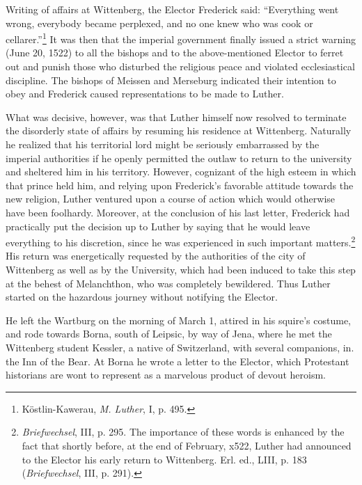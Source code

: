 Writing of affairs at Wittenberg, the Elector Frederick said:
“Everything went wrong, everybody became perplexed, and no one
knew who was cook or cellarer.”\footnote{Köstlin-Kawerau, \textit{M. Luther}, I, p. 495.}
It was then that the imperial government
finally issued a strict warning (June 20, 1522) to all the
bishops and to the above-mentioned Elector to ferret out and punish
those who disturbed the religious peace and violated ecclesiastical discipline.
The bishops of Meissen and Merseburg indicated their intention to obey
and Frederick caused representations to be made to
Luther.

What was decisive, however, was that Luther himself now resolved
to terminate the disorderly state of affairs by resuming his residence
at Wittenberg. Naturally he realized that his territorial lord might
be seriously embarrassed by the imperial authorities if he openly
permitted the outlaw to return to the university and sheltered him
in his territory. However, cognizant of the high esteem in which that
prince held him, and relying upon Frederick’s favorable attitude
towards the new religion, Luther ventured upon a course of action
which would otherwise have been foolhardy. Moreover, at the conclusion
of his last letter, Frederick had practically put the decision
up to Luther by saying that he would leave everything to his discretion,
since he was experienced in such important matters.\footnote
{\textit{Briefwechsel}, III, p. 295. The importance of these words is enhanced by the fact
that shortly before, at the end of February, x522, Luther had announced to the Elector his
early return to Wittenberg. Erl. ed., LIII, p. 183 (\textit{Briefwechsel}, III, p. 291).}
His return was energetically requested by the authorities of the city of
Wittenberg as well as by the University, which had been induced to
take this step at the behest of Melanchthon, who was completely bewildered.
Thus Luther started on the hazardous journey without
notifying the Elector.

He left the Wartburg on the morning of March 1, attired in his
squire’s costume, and rode towards Borna, south of Leipsic, by way of
Jena, where he met the Wittenberg student Kessler, a native of
Switzerland, with several companions, in. the Inn of the Bear. At
Borna he wrote a letter to the Elector, which Protestant historians
are wont to represent as a marvelous product of devout heroism.

